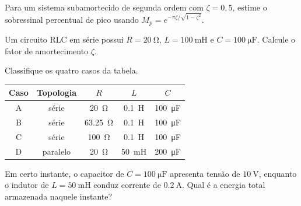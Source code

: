 \begin{questao}[3]{}
Para um sistema subamortecido de segunda ordem com $\zeta=0{,}5$, estime o
sobressinal percentual de pico usando
$M_p=e^{-\pi\zeta/\sqrt{1-\zeta^2}}$.
\end{questao}

\begin{questao}[3]{}
Um circuito RLC em série possui $R=\SI{20}{\ohm}$, $L=\SI{100}{\milli\henry}$ e
$C=\SI{100}{\micro\farad}$. Calcule o fator de amortecimento $\zeta$.
\end{questao}

\begin{questao}[3]{}
Classifique os quatro casos da tabela.

\begin{table}[H]
\centering\small\sffamily
\begin{tabular}{@{}c c c c c@{}}
\toprule
\textbf{Caso} & \textbf{Topologia} & $R$ & $L$ & $C$\\
\midrule
A & série & \SI{20}{\ohm} & \SI{0.1}{\henry} & \SI{100}{\micro\farad}\\
B & série & \SI{63.25}{\ohm} & \SI{0.1}{\henry} & \SI{100}{\micro\farad}\\
C & série & \SI{100}{\ohm} & \SI{0.1}{\henry} & \SI{100}{\micro\farad}\\
D & paralelo & \SI{20}{\ohm} & \SI{50}{\milli\henry} & \SI{200}{\micro\farad}\\
\bottomrule
\end{tabular}
\end{table}
\end{questao}

\begin{questao}[3]{}
Em certo instante, o capacitor de $C=\SI{100}{\micro\farad}$ apresenta
tensão de $\SI{10}{\volt}$, enquanto o indutor de
$L=\SI{50}{\milli\henry}$ conduz corrente de $\SI{0.2}{\ampere}$. Qual é a energia total armazenada naquele instante?
\end{questao}

